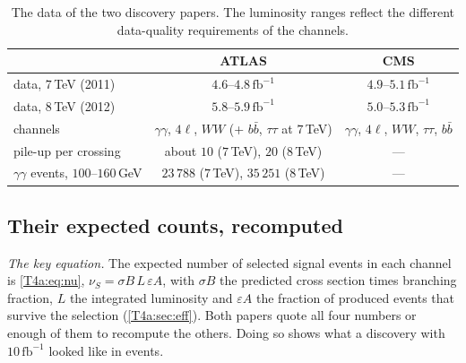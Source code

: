 \begin{table}[htbp]
\centering
\small
\begin{tabular}{lcc}
\toprule
 & ATLAS \cite{AadHiggs2012} & CMS \cite{ChatrchyanHiggs2012} \\
\midrule
data, $7$\,TeV (2011) & $4.6$--$4.8\,\mathrm{fb^{-1}}$ & $4.9$--$5.1\,\mathrm{fb^{-1}}$ \\
data, $8$\,TeV (2012) & $5.8$--$5.9\,\mathrm{fb^{-1}}$ & $5.0$--$5.3\,\mathrm{fb^{-1}}$ \\
channels & $\gamma\gamma$, $4\ell$, $WW$ (+ $b\bar b$, $\tau\tau$ at $7$\,TeV) & $\gamma\gamma$, $4\ell$, $WW$, $\tau\tau$, $b\bar b$ \\
pile-up per crossing & about $10$ ($7$\,TeV), $20$ ($8$\,TeV) & --- \\
$\gamma\gamma$ events, $100$--$160$\,GeV & $23\,788$ ($7$\,TeV), $35\,251$ ($8$\,TeV) & --- \\
\bottomrule
\end{tabular}
\caption{The data of the two discovery papers. The luminosity ranges reflect the different data-quality requirements of the channels.}
\label{T4a:tab:higgs-setup}
\end{table}

\subsection{Their expected counts, recomputed}
\label{T4a:sec:higgs-counts}

\emph{The key equation.} The expected number of selected signal events in each channel is \eqref{T4a:eq:nu}, $\nu_S=\sigma B\,L\,\varepsilon A$, with $\sigma B$ the predicted cross section times branching fraction, $L$ the integrated luminosity and $\varepsilon A$ the fraction of produced events that survive the selection (\cref{T4a:sec:eff}). Both papers quote all four numbers or enough of them to recompute the others. Doing so shows what a discovery with $10\,\mathrm{fb^{-1}}$ looked like in events.

